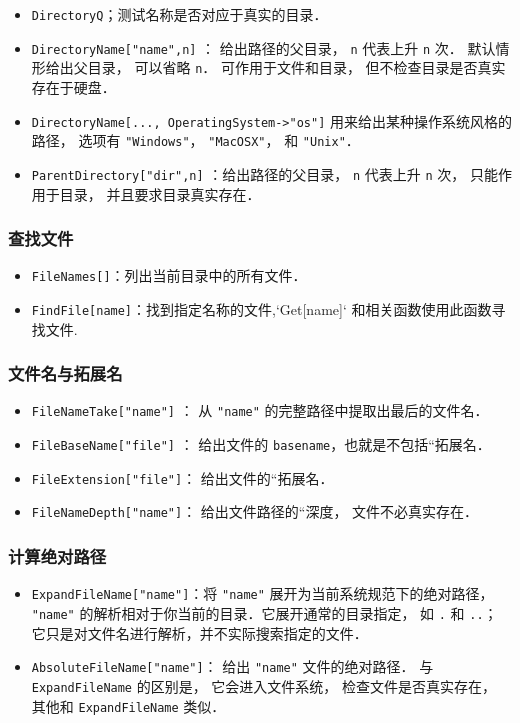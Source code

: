 \begin{itemize}
\item \verb`DirectoryQ`；测试名称是否对应于真实的目录．
\item \verb`DirectoryName["name",n]` ： 给出路径的父目录， \verb`n` 代表上升 \verb`n` 次． 
默认情形给出父目录， 可以省略 \verb`n`． 可作用于文件和目录， 但不检查目录是否真实存在于硬盘．
\item \verb`DirectoryName[..., OperatingSystem->"os"]` 用来给出某种操作系统风格的路径， 
选项有 \verb`"Windows"`， \verb`"MacOSX"`， 和 \verb`"Unix"`．
\item \verb`ParentDirectory["dir",n]` ：给出路径的父目录， \verb`n` 代表上升 \verb`n` 次， 
只能作用于目录， 并且要求目录真实存在．
\end{itemize}

\subsubsection{查找文件}

\begin{itemize}
\item \verb`FileNames[]`：列出当前目录中的所有文件．
\item \verb`FindFile[name]`：找到指定名称的文件,`Get[name]` 和相关函数使用此函数寻找文件.
\end{itemize}

\subsubsection{文件名与拓展名}

\begin{itemize}
\item \verb`FileNameTake["name"]` ： 从 \verb`"name"` 的完整路径中提取出最后的文件名．
\item \verb`FileBaseName["file"]` ： 给出文件的 \verb`basename`，也就是不包括“拓展名．
\item \verb`FileExtension["file"]`： 给出文件的“拓展名．
\item \verb`FileNameDepth["name"]`： 给出文件路径的“深度， 文件不必真实存在．
\end{itemize}

\subsubsection{计算绝对路径}

\begin{itemize}
\item \verb`ExpandFileName["name"]`：将 \verb`"name"` 展开为当前系统规范下的绝对路径， 
\verb`"name"` 的解析相对于你当前的目录．它展开通常的目录指定， 如 \verb`.` 和 \verb`..`；
它只是对文件名进行解析，并不实际搜索指定的文件．
\item \verb`AbsoluteFileName["name"]`： 给出 \verb`"name"` 文件的绝对路径． 
与 \verb`ExpandFileName` 的区别是， 它会进入文件系统， 检查文件是否真实存在，
其他和 \verb`ExpandFileName` 类似．
\end{itemize}

